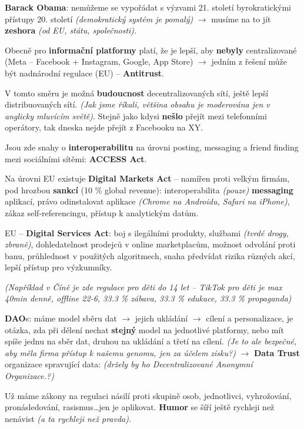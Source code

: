 \textbf{Barack Obama}: nemůžeme se vypořádat s výzvami 21. století byrokratickými přístupy 20. století \textit{(demokratický systém je pomalý)} $\to$ musíme na to jít \textbf{zeshora} \textit{(od EU, státu, společnosti)}.

Obecně pro \textbf{informační platformy} platí, že je lepší, aby \textbf{nebyly} centralizované (Meta -- Facebook + Instagram, Google, App Store) $\to$ jedním z řešení může být nadnárodní regulace (EU) -- \textbf{Antitrust}.

V tomto směru je možná \textbf{budoucnost} decentralizovaných sítí, ještě lepší distribuovaných sítí. \textit{(Jak jsme říkali, většina obsahu je moderována jen v anglicky mluvícím světě)}. Stejně jako kdysi \textbf{nešlo} přejít mezi telefonními operátory, tak dneska nejde přejít z Facebooku na XY.

Jsou zde snahy o \textbf{interoperabilitu} na úrovni posting, messaging a friend finding mezi sociálními sítěmi: \textbf{ACCESS Act}.

Na úrovni EU existuje \textbf{Digital Markets Act} -- namířen proti velkým firmám, pod hrozbou \textbf{sankcí} (10 \% global revenue): interoperabilita \textit{(pouze)} \textbf{messaging} aplikací, právo odinstalovat aplikace \textit{(Chrome na Androidu, Safari na iPhone)}, zákaz self-referencingu, přístup k analytickým datům.

EU -- \textbf{Digital Services Act}: boj s ilegálními produkty, službami \textit{(tvrdé drogy, zbraně)}, dohledatelnost prodejců v online marketplacům, možnost odvolání proti banu, průhlednost v použitých algoritmech, snaha předvídat rizika různých akcí, lepší přístup pro výzkumníky.

\textit{(Například v Číně je zde regulace pro děti do 14 let -- TikTok pro děti je max 40min denně, offline 22-6, 33.3 \% zábava, 33.3 \% edukace, 33.3 \% propaganda)}

\textbf{DAO}s: máme model sběru dat $\to$ jejich ukládání $\to$ cílení a personalizace, je otázka, zda při dělení nechat \textbf{stejný} model na jednotlivé platformy, nebo mít spíše jednu na sběr dat, druhou na ukládání a třetí na cílení. \textit{(Je to ale bezpečné, aby měla firma přístup k našemu genomu, jen za účelem zisku?)} $\to$ \textbf{Data Trust} organizace spravující data: \textit{(držely by ho Decentralizované Anonymní Organizace.?)}

Už máme zákony na regulaci násilí proti skupině osob, jednotlivci, vyhrožování, pronásledování, rasismus\ldots \space jen je aplikovat. \textbf{Humor} se šíří ještě rychleji než nenávist \textit{(a ta rychleji než pravda)}.
